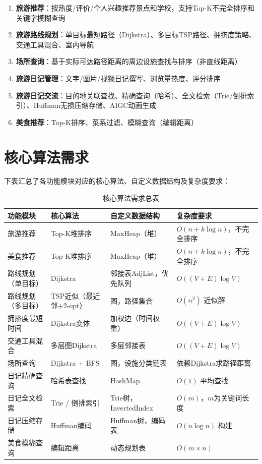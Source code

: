 \documentclass[12pt,a4paper]{report}
\begin{document}
\begin{enumerate}
    \item \textbf{旅游推荐}：按热度/评价/个人兴趣推荐景点和学校，支持Top-K不完全排序和关键字模糊查询
    \item \textbf{旅游路线规划}：单目标最短路径（Dijkstra）、多目标TSP路径、拥挤度策略、交通工具混合、室内导航
    \item \textbf{场所查询}：基于实际可达路径距离的周边设施查找与排序（非直线距离）
    \item \textbf{旅游日记管理}：文字/图片/视频日记撰写、浏览量热度、评分排序
    \item \textbf{旅游日记交流}：目的地关联查找、精确查询（哈希）、全文检索（Trie/倒排索引）、Huffman无损压缩存储、AIGC动画生成
    \item \textbf{美食推荐}：Top-K排序、菜系过滤、模糊查询（编辑距离）
\end{enumerate}

\section{核心算法需求}

下表汇总了各功能模块对应的核心算法、自定义数据结构及复杂度要求：

\begin{table}[H]
\centering
\caption{核心算法需求总表}
\small
\begin{tabularx}{\textwidth}{>{\centering}p{2.8cm} >{\centering}p{3.5cm} >{\centering}p{3.5cm} X}
\toprule
\textbf{功能模块} & \textbf{核心算法} & \textbf{自定义数据结构} & \textbf{复杂度要求} \\
\midrule
旅游推荐 & Top-K堆排序 & MaxHeap（堆） & $O(n + k \log n)$，不完全排序 \\
美食推荐 & Top-K堆排序 & MaxHeap（堆） & $O(n + k \log n)$，不完全排序 \\
路线规划（单目标） & Dijkstra & 邻接表AdjList，优先队列 & $O((V+E) \log V)$ \\
路线规划（多目标） & TSP近似（最近邻+2-opt） & 图，路径集合 & $O(n^2)$ 近似解 \\
拥挤度最短时间 & Dijkstra变体 & 加权边（时间权重） & $O((V+E) \log V)$ \\
交通工具混合 & 多层图Dijkstra & 多层邻接表 & $O((V+E) \log V)$ \\
场所查询 & Dijkstra + BFS & 图，设施分类链表 & 依赖Dijkstra求路径距离 \\
日记精确查询 & 哈希表查找 & HashMap & $O(1)$ 平均查找 \\
日记全文检索 & Trie / 倒排索引 & Trie树，InvertedIndex & $O(m)$，$m$为关键词长度 \\
日记压缩存储 & Huffman编码 & Huffman树，编码表 & $O(n \log n)$ 构建 \\
美食模糊查询 & 编辑距离 & 动态规划表 & $O(m \times n)$ \\
\bottomrule
\end{tabularx}
\end{table}
\end{document}
